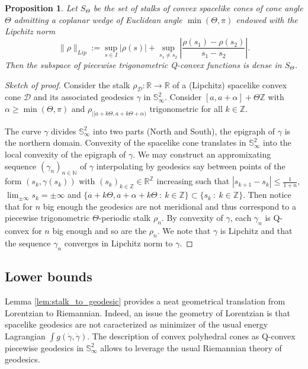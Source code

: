 \documentclass[a4paper,12pt]{article}
\def\ZZ{\mathbb{Z}}
\def\D{\mathcal{D}}
\def\D{\mathcal{D}}
\def\RR{\mathbb{R}}
\def\SS{\mathbb{S}}
\def\D{\mathcal{D}}
\newtheorem{prop}[lem]{Proposition}
\theoremstyle{definition}
\begin{document}
                    \begin{prop}\label{prop:density}
                    Let $S_\Theta$ be the set of stalks of convex spacelike cones  of cone angle $\Theta$ admitting a coplanar wedge of Euclidean angle $\min(\Theta,\pi)$ endowed with the Lipchitz norm 
                        $$\|\rho\|_{Lip}:= \sup_{s \in I}{|\rho(s)|} +  \sup_{s_1\neq s_2}\left|\frac{\rho(s_1)-\rho(s_2)}{s_1-s_2}\right|.$$
					 Then the subspace of piecewise trigonometric Q-convex functions is dense in $S_\Theta$. 
					\end{prop}
					\begin{proof}[Sketch of proof]

					 Consider the stalk $\rho_\D: \RR \rightarrow \RR$ of a (Lipchitz) spacelike convex cone $\D$ and its associated geodesics $\gamma$ in $\SS^2_{\infty}$.  Consider $[a,a+\alpha]+\Theta \ZZ$ with $\alpha\geq \min(\Theta,\pi)$ and $\rho_{|[a+k\Theta,a+k\Theta+\alpha)}$ trigonometric for all $k\in \ZZ$.
					 
					 The curve $\gamma$ divides $\SS^2_\infty$ into two parts (North and South), the epigraph of $\gamma$ is the northern domain.  
					 Convexity of the spacelike cone translates in $\SS^{2}_{\infty}$ into the local convexity of the epigraph of $\gamma$. We may construct an appromixating sequence $(\gamma_n)_{n\in \mathbb N}$ of $\gamma$ interpolating by geodesics say between points of the form $(s_k,\gamma(s_k))$ with $(s_k)_{k\in \ZZ}\in \RR^\ZZ$ increasing such that $|s_{k+1}-s_k|\leq \frac{1}{1+n}$, $\lim_{\pm \infty} s_k = \pm \infty$   and $\{a+k\Theta,a+\alpha+k\Theta ~:~ k\in \ZZ\} \subset \{s_k~:~k\in\ZZ\}$. Then notice that for $n$ big enough the geodesics are not meridional and thus correspond to a piecewise trigonometric $\Theta$-periodic stalk $\rho_n$. By convexity of $\gamma$, each $\gamma_n$ is Q-convex for $n$ big enough and so are the $\rho_n$. We note that $\gamma$ is Lipchitz and that the sequence $\gamma_n$ converges in Lipchitz norm to $\gamma$.\end{proof}
					\subsection{Lower bounds}
					Lemma \ref{lem:stalk_to_geodesic} provides a neat geometrical translation from Lorentzian to Riemannian. Indeed, an issue the geometry of Lorentzian is that spacelike geodesics are not caracterized as minimizer of the usual energy Lagrangian $\int g(\dot \gamma,\dot \gamma)$. The description of convex polyhedral cones as Q-convex piecewise geodesics in $\SS^2_\infty$ allows to leverage the usual Riemannian theory of geodesics.					
					
\end{document}

